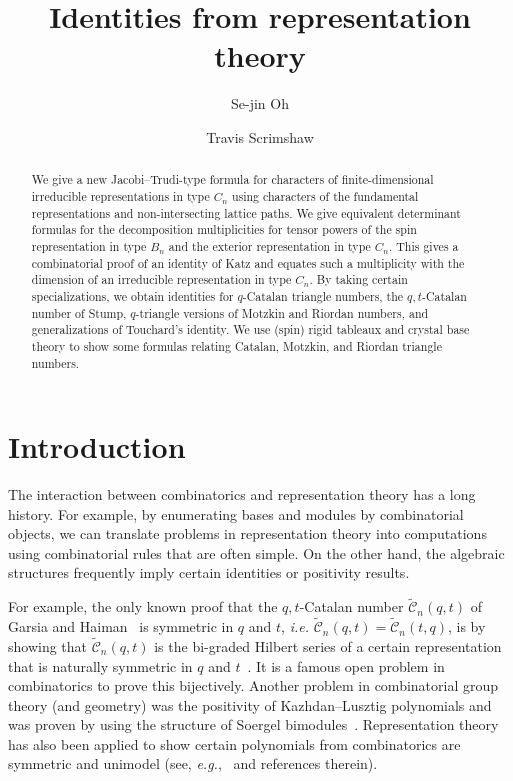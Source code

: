 \documentclass[11pt, leqno]{amsart}
\title{Identities from representation theory}
\author[S.-j.~Oh]{Se-jin Oh}
\author[T.~Scrimshaw]{Travis Scrimshaw}
\theoremstyle{plain}
\theoremstyle{definition}
\numberwithin{equation}{section}
\newcommand{\Cat}{\mathcal{C}} %
\newcommand{\CatCR}{\widetilde{\Cat}} %
\begin{document}
\begin{abstract}
We give a new Jacobi--Trudi-type formula for characters of finite-dimensional irreducible representations in type $C_n$ using characters of the fundamental representations and non-intersecting lattice paths.
We give equivalent determinant formulas for the decomposition multiplicities for tensor powers of the spin representation in type $B_n$ and the exterior representation in type $C_n$.
This gives a combinatorial proof of an identity of Katz and equates such a multiplicity with the dimension of an irreducible representation in type $C_n$.
By taking certain specializations, we obtain identities for $q$-Catalan triangle numbers, the $q,t$-Catalan number of Stump, $q$-triangle versions of Motzkin and Riordan numbers, and generalizations of Touchard's identity.
We use (spin) rigid tableaux and crystal base theory to show some formulas relating Catalan, Motzkin, and Riordan triangle numbers.
\end{abstract}


\maketitle
\tableofcontents

\section{Introduction}

The interaction between combinatorics and representation theory has a long history. For example, by enumerating bases and modules by combinatorial objects, we can translate problems in representation theory into computations using combinatorial rules that are often simple. On the other hand, the algebraic structures frequently imply certain identities or positivity results.

For example, the only known proof that the $q,t$-Catalan number $\CatCR_n(q,t)$ of Garsia and Haiman~\cite{GH96} is symmetric in $q$ and $t$, \textit{i.e.} $\CatCR_n(q,t) = \CatCR_n(t,q)$, is by showing that $\CatCR_n(q,t)$ is the bi-graded Hilbert series of a certain representation that is naturally symmetric in $q$ and $t$~\cite{GH01,GH02}. It is a famous open problem in combinatorics to prove this bijectively.
Another problem in combinatorial group theory (and geometry) was the positivity of Kazhdan--Lusztig polynomials and was proven by using the structure of Soergel bimodules~\cite{EW14,Soergel07}.
Representation theory has also been applied to show certain polynomials from combinatorics are symmetric and unimodel (see, \textit{e.g.},~\cite{Stanley80} and references therein).
\end{document}
